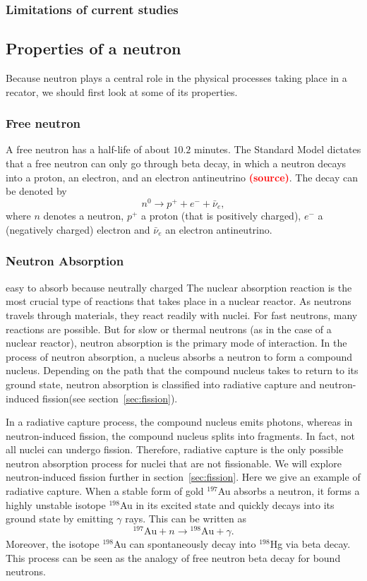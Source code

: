 \documentclass[preprint,aip,cha]{revtex4-1}
\newcommand{\red}[1]{\textcolor{red}{\bf #1}}
\begin{document}
        \subsubsection{Limitations of current studies}
    \subsection{Properties of a neutron}
        Because neutron plays a central role in the physical processes taking
        place in a recator, we should first look at some of its
        properties.
        \subsubsection{Free neutron}
        A free neutron has a half-life of about $10.2$ minutes. \cite{gc01} The Standard
        Model dictates that a free neutron can only go through beta decay, in which a neutron decays
        into a proton, an electron, and an electron antineutrino \red{(source)}. The decay can be denoted by
        \[n^0 \rightarrow p^+ + e^- + \bar{\nu}_e,\]
        where $n$ denotes a neutron, $p^+$ a proton (that is positively charged), $e^-$ a
        (negatively charged) electron and $\bar{\nu}_e$ an electron antineutrino.

        \subsubsection{Neutron Absorption}
        easy to absorb because neutrally charged
        The nuclear absorption reaction is the most crucial type of reactions that takes place in
        a nuclear reactor. As neutrons travels through materials, they react readily with nuclei.
        For fast neutrons, many reactions are possible. But for slow or thermal neutrons (as in the
        case of a nuclear reactor), neutron absorption is the primary mode of interaction.
        In the process of neutron absorption, a nucleus absorbs a neutron to form
        a compound nucleus. Depending on the path that the compound nucleus takes to return to its ground
        state, neutron absorption is classified into radiative capture and neutron-induced
        fission(see section~\ref{sec:fission}).
        
        In a radiative capture process, the compound nucleus emits photons, whereas in neutron-induced
        fission, the compound nucleus splits into fragments.
        In fact, not all nuclei can undergo fission.
        Therefore, radiative capture is the only possible neutron absorption process for
        nuclei that are not fissionable.\cite{l66} We will explore neutron-induced fission further in
        section~\ref{sec:fission}. Here we give an example of radiative capture. When a stable form
        of gold ${}^{197}$Au absorbs a neutron, it forms a highly unstable isotope ${}^{198}$Au in its
        excited state and quickly decays into its ground state by emitting $\gamma$ rays. This can be
        written as
        \[{}^{197}\text{Au} + n \rightarrow {}^{198}\text{Au} + \gamma.\]
        Moreover, the isotope ${}^{198}$Au can spontaneously decay into ${}^{198}$Hg via beta decay. This process can
        be seen as the analogy of free neutron beta decay for bound neutrons.
\end{document}

